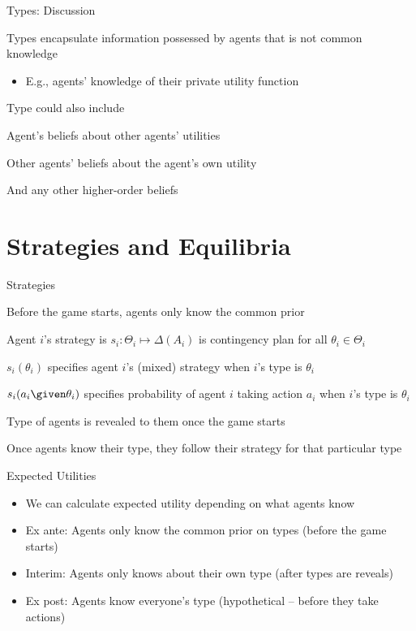 \documentclass[11pt,aspectratio=169]{beamer}
\begin{document}
  
  \begin{frame}{Types: Discussion}
   \begin{itemizes}
    \item Types encapsulate information possessed by agents that is \alert{not} common knowledge
    \begin{itemize}
     \item E.g., agents' knowledge of their private utility function
    \end{itemize}
    \item Type could also include
    \begin{itemizes}[0.7em]
     \item Agent's beliefs about other agents' utilities
     \item Other agents' beliefs about the agent's own utility
     \item And any other higher-order beliefs
    \end{itemizes}
   \end{itemizes}
  \end{frame}
  
 \section{Strategies and Equilibria}

  \begin{frame}{Strategies}
   \begin{itemizes}[1.2em]
    \item \alert{Before} the game starts, agents only know the common prior
    \item Agent $i$'s strategy is $s_i: \Theta_i \mapsto \Delta(A_i)$ is \alert{contingency plan} for all $\theta_i \in \Theta_i$
    \item $s_i(\theta_i)$ specifies agent $i$'s (mixed) strategy when $i$'s type is $\theta_i$
    \item $s_i(a_i \given \theta_i)$ specifies probability of agent $i$ taking action $a_i$ when $i$'s type is $\theta_i$
    \item Type of agents is \alert{revealed} to them once the game \alert{starts}
    \item Once agents know their type, they follow their strategy for that particular type
   \end{itemizes}
  \end{frame}
  
  
  \begin{frame}{Expected Utilities}
   \begin{itemize}[<+->]
   \setlength{\itemsep}{1.5em}
    \item We can calculate expected utility depending on what agents know
    \item \alert{Ex ante}: Agents only know the common prior on types (before the game starts)
    \item \alert{Interim}: Agents only knows about their own type (after types are reveals)
    \item \alert{Ex post}: Agents know everyone's type (hypothetical -- before they take actions)
   \end{itemize}
  \end{frame}
\end{document}
